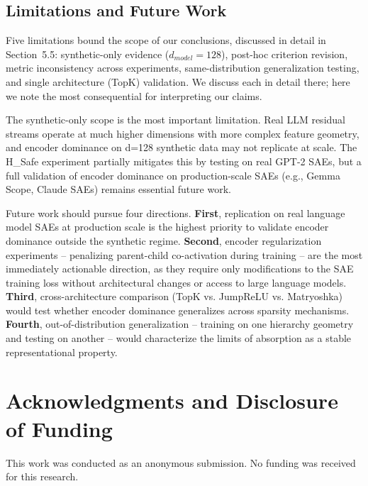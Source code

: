 \documentclass{article}
\begin{document}
\subsection{Limitations and Future Work}

Five limitations bound the scope of our conclusions, discussed in detail in Section~5.5: synthetic-only evidence ($d_{model} = 128$), post-hoc criterion revision, metric inconsistency across experiments, same-distribution generalization testing, and single architecture (TopK) validation. We discuss each in detail there; here we note the most consequential for interpreting our claims.

The synthetic-only scope is the most important limitation. Real LLM residual streams operate at much higher dimensions with more complex feature geometry, and encoder dominance on d=128 synthetic data may not replicate at scale. The H\_Safe experiment partially mitigates this by testing on real GPT-2 SAEs, but a full validation of encoder dominance on production-scale SAEs (e.g., Gemma Scope, Claude SAEs) remains essential future work.

Future work should pursue four directions. \textbf{First}, replication on real language model SAEs at production scale is the highest priority to validate encoder dominance outside the synthetic regime. \textbf{Second}, encoder regularization experiments -- penalizing parent-child co-activation during training -- are the most immediately actionable direction, as they require only modifications to the SAE training loss without architectural changes or access to large language models. \textbf{Third}, cross-architecture comparison (TopK vs. JumpReLU vs. Matryoshka) would test whether encoder dominance generalizes across sparsity mechanisms. \textbf{Fourth}, out-of-distribution generalization -- training on one hierarchy geometry and testing on another -- would characterize the limits of absorption as a stable representational property.

\section*{Acknowledgments and Disclosure of Funding}

\begin{ack}
This work was conducted as an anonymous submission. No funding was received for this research.
\end{ack}



\end{document}
